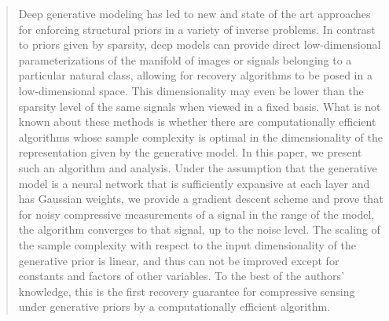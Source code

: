 \begin{abstract}
Deep generative modeling has led to new and state of the art approaches for enforcing structural priors in a variety of inverse problems.  In contrast to priors given by sparsity, deep models can provide direct low-dimensional parameterizations of the manifold of images or signals belonging to a particular natural  class, allowing for recovery algorithms to be posed in a low-dimensional space.  This dimensionality may even be lower than the sparsity level of the same signals when viewed in a fixed basis.  What is not known about these methods is whether there are computationally efficient algorithms whose sample complexity is optimal in the dimensionality of the representation given by the generative model.  In this paper, we present such an algorithm and analysis.  Under the assumption that the generative model is a neural network that is sufficiently expansive at each layer and has Gaussian weights, we provide a gradient descent scheme and prove that for noisy compressive measurements of a signal in the range of the model, the algorithm converges to that signal, up to the noise level.  The scaling of the sample complexity with respect to the input dimensionality of the generative prior is linear, and thus can not be improved except for constants and factors of other variables.  To the best of the authors' knowledge, this is the first recovery guarantee for compressive sensing under generative priors by a computationally efficient algorithm.

\end{abstract}

